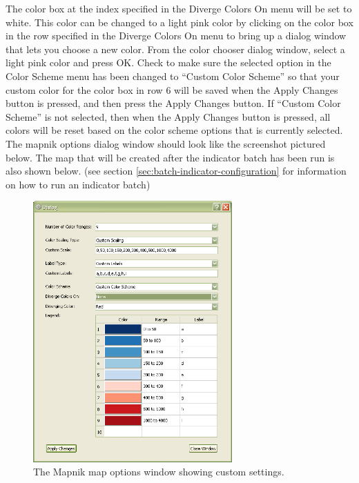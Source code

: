 The color box at the index specified in the Diverge Colors On menu 
will be set to white. This color can be changed to a light pink 
color by clicking on the color box in the row specified in 
the Diverge Colors On menu to bring up a dialog window that lets 
you choose a new color. From the color chooser dialog window, select 
a light pink color and press OK.  Check to make sure the selected option in the 
Color Scheme menu has been changed to ``Custom Color Scheme'' so that your custom color 
for the color box in row 6 will be saved when the Apply Changes button 
is pressed, and then press the Apply Changes button. If 
``Custom Color Scheme'' is not selected, then when the Apply Changes 
button is pressed, all colors will be reset based on the color scheme
options that is currently selected. The mapnik 
options dialog window should look like the screenshot pictured below. 
The map that will be created after the indicator batch has been run 
is also shown below. (see section \ref{sec:batch-indicator-configuration}
for information on how to run an indicator batch)

\begin{figure}[hb]
\begin{center}
\includegraphics[width=3in]{part-gui/images/result-manager-custom-mapnik-settings.png}
\end{center}
\caption{The Mapnik map options window showing custom settings.}
\label{fig:result-manager-custom-mapnik-settings}
\end{figure}
\clearpage

